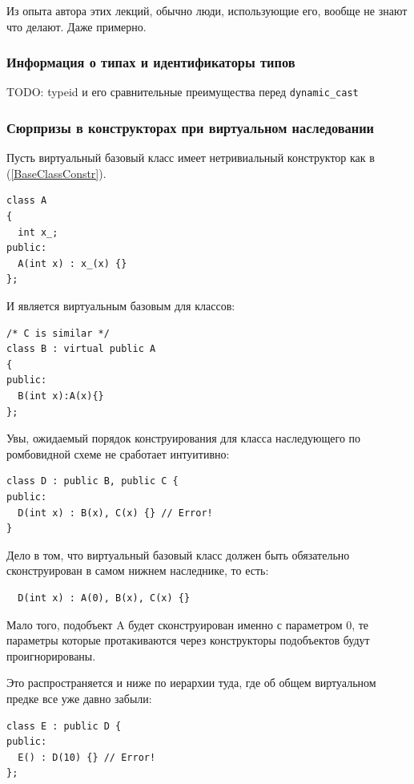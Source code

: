 \documentclass[a4paper,12pt,oneside]{article}
\begin{document}
Из опыта автора этих лекций, обычно люди, использующие его, вообще не знают что делают. Даже примерно.

\subsubsection{Информация о типах и идентификаторы типов}\label{TypeInfo}

TODO: typeid и его сравнительные преимущества перед \lstinline!dynamic_cast!

\subsubsection{Сюрпризы в конструкторах при виртуальном наследовании}\label{VirtualBaseClassConstr}

Пусть виртуальный базовый класс имеет нетривиальный конструктор как в (\ref{BaseClassConstr}).

\begin{lstlisting}
class A 
{
  int x_;
public:
  A(int x) : x_(x) {}
};
\end{lstlisting}

И является виртуальным базовым для классов:

\begin{lstlisting}
/* C is similar */
class B : virtual public A
{
public:
  B(int x):A(x){}
};
\end{lstlisting}

Увы, ожидаемый порядок конструирования для класса наследующего по ромбовидной схеме не сработает интуитивно:

\begin{lstlisting}
class D : public B, public C {
public:
  D(int x) : B(x), C(x) {} // Error!
}
\end{lstlisting}

Дело в том, что виртуальный базовый класс должен быть обязательно сконструирован в самом нижнем наследнике, то есть:

\begin{lstlisting}
  D(int x) : A(0), B(x), C(x) {} 
\end{lstlisting}

Мало того, подобъект A будет сконструирован именно с параметром 0, те параметры которые протакиваются через конструкторы подобъектов будут проигнорированы.

Это распространяется и ниже по иерархии туда, где об общем виртуальном предке все уже давно забыли:

\begin{lstlisting}
class E : public D {
public:
  E() : D(10) {} // Error!
};
\end{lstlisting}
\end{document}
